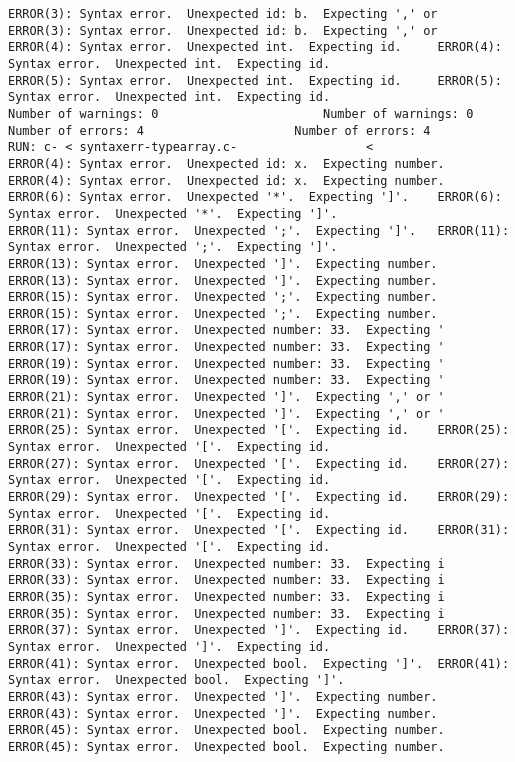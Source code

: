 \documentclass[12pt]{book}
\begin{document}
\begin{lstlisting}
ERROR(3): Syntax error.  Unexpected id: b.  Expecting ',' or 	ERROR(3): Syntax error.  Unexpected id: b.  Expecting ',' or 
ERROR(4): Syntax error.  Unexpected int.  Expecting id.		ERROR(4): Syntax error.  Unexpected int.  Expecting id.
ERROR(5): Syntax error.  Unexpected int.  Expecting id.		ERROR(5): Syntax error.  Unexpected int.  Expecting id.
Number of warnings: 0						Number of warnings: 0
Number of errors: 4						Number of errors: 4
RUN: c- < syntaxerr-typearray.c-			      <
ERROR(4): Syntax error.  Unexpected id: x.  Expecting number.	ERROR(4): Syntax error.  Unexpected id: x.  Expecting number.
ERROR(6): Syntax error.  Unexpected '*'.  Expecting ']'.	ERROR(6): Syntax error.  Unexpected '*'.  Expecting ']'.
ERROR(11): Syntax error.  Unexpected ';'.  Expecting ']'.	ERROR(11): Syntax error.  Unexpected ';'.  Expecting ']'.
ERROR(13): Syntax error.  Unexpected ']'.  Expecting number.	ERROR(13): Syntax error.  Unexpected ']'.  Expecting number.
ERROR(15): Syntax error.  Unexpected ';'.  Expecting number.	ERROR(15): Syntax error.  Unexpected ';'.  Expecting number.
ERROR(17): Syntax error.  Unexpected number: 33.  Expecting '	ERROR(17): Syntax error.  Unexpected number: 33.  Expecting '
ERROR(19): Syntax error.  Unexpected number: 33.  Expecting '	ERROR(19): Syntax error.  Unexpected number: 33.  Expecting '
ERROR(21): Syntax error.  Unexpected ']'.  Expecting ',' or '	ERROR(21): Syntax error.  Unexpected ']'.  Expecting ',' or '
ERROR(25): Syntax error.  Unexpected '['.  Expecting id.	ERROR(25): Syntax error.  Unexpected '['.  Expecting id.
ERROR(27): Syntax error.  Unexpected '['.  Expecting id.	ERROR(27): Syntax error.  Unexpected '['.  Expecting id.
ERROR(29): Syntax error.  Unexpected '['.  Expecting id.	ERROR(29): Syntax error.  Unexpected '['.  Expecting id.
ERROR(31): Syntax error.  Unexpected '['.  Expecting id.	ERROR(31): Syntax error.  Unexpected '['.  Expecting id.
ERROR(33): Syntax error.  Unexpected number: 33.  Expecting i	ERROR(33): Syntax error.  Unexpected number: 33.  Expecting i
ERROR(35): Syntax error.  Unexpected number: 33.  Expecting i	ERROR(35): Syntax error.  Unexpected number: 33.  Expecting i
ERROR(37): Syntax error.  Unexpected ']'.  Expecting id.	ERROR(37): Syntax error.  Unexpected ']'.  Expecting id.
ERROR(41): Syntax error.  Unexpected bool.  Expecting ']'.	ERROR(41): Syntax error.  Unexpected bool.  Expecting ']'.
ERROR(43): Syntax error.  Unexpected ']'.  Expecting number.	ERROR(43): Syntax error.  Unexpected ']'.  Expecting number.
ERROR(45): Syntax error.  Unexpected bool.  Expecting number.	ERROR(45): Syntax error.  Unexpected bool.  Expecting number.

\end{lstlisting}
\end{document}
